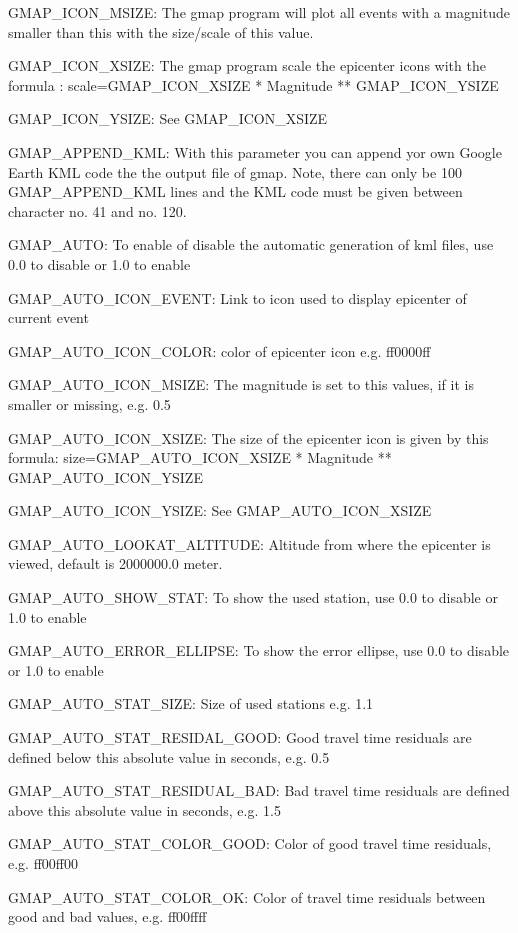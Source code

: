 GMAP\_ICON\_MSIZE: The gmap program will plot all events with a magnitude smaller than this with the 
size/scale of this value.

GMAP\_ICON\_XSIZE: The gmap program scale the epicenter icons with 
the formula : \newline
scale=GMAP\_ICON\_XSIZE * Magnitude ** GMAP\_ICON\_YSIZE 

GMAP\_ICON\_YSIZE: See GMAP\_ICON\_XSIZE 

GMAP\_APPEND\_KML: With this parameter you can 
append yor own Google Earth KML code the the 
output file of gmap. Note, there can only be 100 GMAP\_APPEND\_KML 
lines and the KML code must be given between character no. 41 and no. 120. 

GMAP\_AUTO: To enable of disable the automatic generation of kml files, use 0.0 to disable or 1.0 to enable

GMAP\_AUTO\_ICON\_EVENT: Link to icon used to display epicenter of current event

GMAP\_AUTO\_ICON\_COLOR: color of epicenter icon e.g. ff0000ff

GMAP\_AUTO\_ICON\_MSIZE: The magnitude is set to this values, if it is smaller or missing, e.g. 0.5

GMAP\_AUTO\_ICON\_XSIZE: The size of the epicenter icon is given by this formula:\newline
size=GMAP\_AUTO\_ICON\_XSIZE * Magnitude ** GMAP\_AUTO\_ICON\_YSIZE

GMAP\_AUTO\_ICON\_YSIZE: See GMAP\_AUTO\_ICON\_XSIZE

GMAP\_AUTO\_LOOKAT\_ALTITUDE: Altitude from where the epicenter is viewed, default is 2000000.0 meter.

GMAP\_AUTO\_SHOW\_STAT: To show the used station, use 0.0 to disable or 1.0 to enable

GMAP\_AUTO\_ERROR\_ELLIPSE: To show the error ellipse, use 0.0 to disable or 1.0 to enable

GMAP\_AUTO\_STAT\_SIZE: Size of used stations e.g. 1.1

GMAP\_AUTO\_STAT\_RESIDAL\_GOOD: Good travel time residuals are defined below this absolute value in seconds, e.g. 0.5

GMAP\_AUTO\_STAT\_RESIDUAL\_BAD: Bad travel time residuals are defined above this absolute value in seconds, e.g. 1.5

GMAP\_AUTO\_STAT\_COLOR\_GOOD: Color of good travel time residuals, e.g. ff00ff00

GMAP\_AUTO\_STAT\_COLOR\_OK: Color of travel time residuals between good and bad values, e.g. ff00ffff

